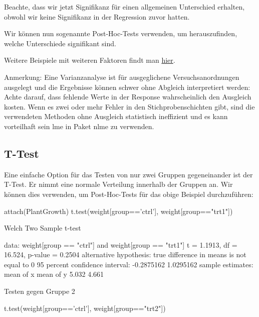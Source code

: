 \documentclass[a4paper,twoside]{tufte-book}\usepackage[]{graphicx}\usepackage[]{color}
\begin{document}
\begin{appendices}
Beachte, dass wir jetzt Signifikanz für einen allgemeinen Unterschied erhalten, obwohl wir keine Signifikanz in der Regression zuvor hatten.

Wir können nun sogenannte Post-Hoc-Tests verwenden, um herauszufinden, welche Unterschiede signifikant sind.

Weitere Beispiele mit weiteren Faktoren findt man \href{http://www.statmethods.net/stats/anova.html}{hier}.


Anmerkung: Eine Varianzanalyse ist für ausgeglichene Versuchsanordnungen ausgelegt und die Ergebnisse können schwer ohne Abgleich interpretiert werden: Achte darauf, dass fehlende Werte in der Response wahrscheinlich den Ausgleich kosten. Wenn es zwei oder mehr Fehler in den Stichprobenschichten gibt, sind die verwendeten Methoden ohne Ausgleich statistisch ineffizient und es kann vorteilhaft sein lme in Paket nlme zu verwenden.

\subsection{T-Test}

Eine einfache Option für das Testen von nur zwei Gruppen gegeneinander ist der T-Test. Er nimmt eine normale Verteilung innerhalb der Gruppen an. Wir können dies verwenden, um Post-Hoc-Tests für das obige Beispiel durchzuführen:

\begin{Schunk}
\begin{Sinput}
attach(PlantGrowth)
t.test(weight[group=='ctrl'], weight[group=="trt1"])
\end{Sinput}
\begin{Soutput}

	Welch Two Sample t-test

data:  weight[group == "ctrl"] and weight[group == "trt1"]
t = 1.1913, df = 16.524, p-value = 0.2504
alternative hypothesis: true difference in means is not equal to 0
95 percent confidence interval:
 -0.2875162  1.0295162
sample estimates:
mean of x mean of y 
    5.032     4.661 
\end{Soutput}
\end{Schunk}

Testen gegen Gruppe 2

\begin{Schunk}
\begin{Sinput}
t.test(weight[group=='ctrl'], weight[group=="trt2"])
\end{Sinput}
\begin{Soutput}


\end{Soutput}
\end{Schunk}
\end{appendices}
\end{document}
